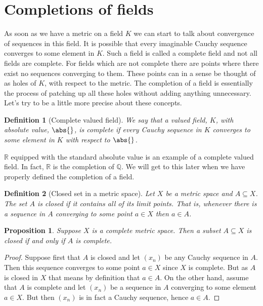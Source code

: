 \documentclass{article}
\newtheorem{definition}{Definition}[section]
\newtheorem{proposition}{Proposition}[section]
\newcommand{\mbb}[1]{\mathbb{#1}}
\begin{document}
\section{Completions of fields}
As soon as we have a metric on a field $K$ we can start to talk about convergence of sequences in this field. It is possible that every imaginable Cauchy sequence converges to some element in $K$. Such a field is called a complete field and not all fields are complete. For fields which are not complete there are points where there exist no sequences converging to them. These points can in a sense be thought of as holes of $K$, with respect to the metric. The completion of a field is essentially the process of patching up all these holes without adding anything unnecessary. Let's try to be a little more precise about these concepts. 

\begin{definition}[Complete valued field]
    We say that a valued field, $K$, with absolute value, $\abs{}$, is complete if every Cauchy sequence in $K$ converges to some element in $K$ with respect to $\abs{}$.
\end{definition}

$\mbb R$ equipped with the standard absolute value is an example of a complete valued field. In fact, $\mbb R$ is the completion of $\mbb Q$. We will get to this later when we have properly defined the completion of a field.

\begin{definition}[Closed set in a metric space]
    Let $X$ be a metric space and $A \subseteq X$. The set $A$ is closed if it contains all of its limit points. That is, whenever there is a sequence in $A$ converging to some point $a \in X$ then $a \in A$.
\end{definition}

\begin{proposition}
    Suppose $X$ is a complete metric space. Then a subset $A \subseteq X$ is closed if and only if $A$ is complete.
\end{proposition}
\begin{proof}
    Suppose first that $A$ is closed and let $(x_n)$ be any Cauchy sequence in $A$. Then this sequence converges to some point $a \in X$ since $X$ is complete. But as $A$ is closed in $X$ that means by definition that $a \in A$. On the other hand, assume that $A$ is complete and let $(x_n)$ be a sequence in $A$ converging to some element $a \in X$. But then $(x_n)$ is in fact a Cauchy sequence, hence $a \in A$.  
\end{proof}
\end{document}
